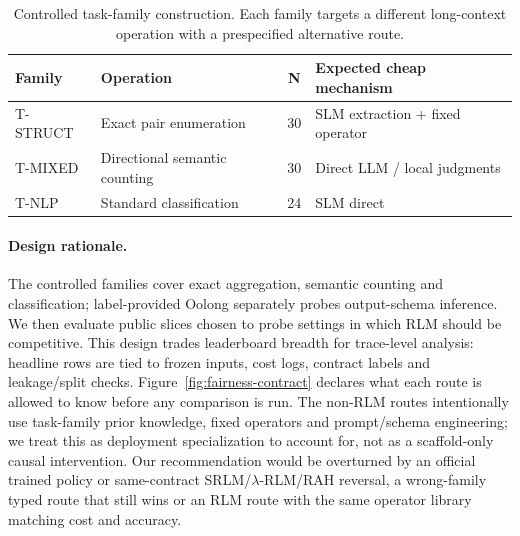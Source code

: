 \documentclass[letterpaper]{article}
\begin{document}
\begin{table}[t]
\centering
\small
\setlength{\tabcolsep}{3pt}
\begin{tabular}{@{}L{1.75cm}L{3.05cm}cL{2.55cm}@{}}
\toprule
\textbf{Family} & \textbf{Operation} & \textbf{N} & \textbf{Expected cheap mechanism} \\
\midrule
T-STRUCT & Exact pair enumeration & 30 & SLM extraction + fixed operator \\
\addlinespace[3pt]
T-MIXED & Directional semantic counting & 30 & Direct LLM / local judgments \\
\addlinespace[3pt]
T-NLP & Standard classification & 24 & SLM direct \\
\bottomrule
\end{tabular}
\caption{Controlled task-family construction. Each family targets a different long-context operation with a prespecified alternative route.}
\label{tab:task-design}
\end{table}

\paragraph{Design rationale.}
The controlled families cover exact aggregation, semantic counting and classification; label-provided Oolong separately probes output-schema inference. We then evaluate public slices chosen to probe settings in which RLM should be competitive. This design trades leaderboard breadth for trace-level analysis: headline rows are tied to frozen inputs, cost logs, contract labels and leakage/split checks. Figure~\ref{fig:fairness-contract} declares what each route is allowed to know before any comparison is run. The non-RLM routes intentionally use task-family prior knowledge, fixed operators and prompt/schema engineering; we treat this as deployment specialization to account for, not as a scaffold-only causal intervention. Our recommendation would be overturned by an official trained policy or same-contract SRLM/$\lambda$-RLM/RAH reversal, a wrong-family typed route that still wins or an RLM route with the same operator library matching cost and accuracy.
\end{document}
